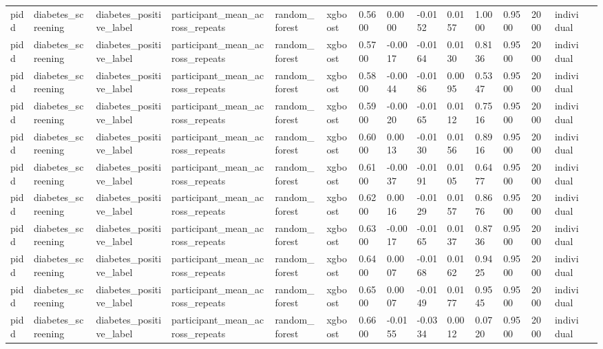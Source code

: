 \begin{tabular}{lllllllllllllll}
pidd & diabetes\_screening & diabetes\_positive\_label & participant\_mean\_across\_repeats & random\_forest & xgboost & 0.5600 & 0.0000 & -0.0152 & 0.0157 & 1.0000 & 0.9500 & 2000 & individual &  \\
pidd & diabetes\_screening & diabetes\_positive\_label & participant\_mean\_across\_repeats & random\_forest & xgboost & 0.5700 & -0.0017 & -0.0164 & 0.0130 & 0.8136 & 0.9500 & 2000 & individual &  \\
pidd & diabetes\_screening & diabetes\_positive\_label & participant\_mean\_across\_repeats & random\_forest & xgboost & 0.5800 & -0.0044 & -0.0186 & 0.0095 & 0.5347 & 0.9500 & 2000 & individual &  \\
pidd & diabetes\_screening & diabetes\_positive\_label & participant\_mean\_across\_repeats & random\_forest & xgboost & 0.5900 & -0.0020 & -0.0165 & 0.0112 & 0.7516 & 0.9500 & 2000 & individual &  \\
pidd & diabetes\_screening & diabetes\_positive\_label & participant\_mean\_across\_repeats & random\_forest & xgboost & 0.6000 & 0.0013 & -0.0130 & 0.0156 & 0.8916 & 0.9500 & 2000 & individual &  \\
pidd & diabetes\_screening & diabetes\_positive\_label & participant\_mean\_across\_repeats & random\_forest & xgboost & 0.6100 & -0.0037 & -0.0191 & 0.0105 & 0.6477 & 0.9500 & 2000 & individual &  \\
pidd & diabetes\_screening & diabetes\_positive\_label & participant\_mean\_across\_repeats & random\_forest & xgboost & 0.6200 & 0.0016 & -0.0129 & 0.0157 & 0.8676 & 0.9500 & 2000 & individual &  \\
pidd & diabetes\_screening & diabetes\_positive\_label & participant\_mean\_across\_repeats & random\_forest & xgboost & 0.6300 & -0.0017 & -0.0165 & 0.0137 & 0.8736 & 0.9500 & 2000 & individual &  \\
pidd & diabetes\_screening & diabetes\_positive\_label & participant\_mean\_across\_repeats & random\_forest & xgboost & 0.6400 & 0.0007 & -0.0168 & 0.0162 & 0.9425 & 0.9500 & 2000 & individual &  \\
pidd & diabetes\_screening & diabetes\_positive\_label & participant\_mean\_across\_repeats & random\_forest & xgboost & 0.6500 & 0.0007 & -0.0149 & 0.0177 & 0.9545 & 0.9500 & 2000 & individual &  \\
pidd & diabetes\_screening & diabetes\_positive\_label & participant\_mean\_across\_repeats & random\_forest & xgboost & 0.6600 & -0.0155 & -0.0334 & 0.0012 & 0.0720 & 0.9500 & 2000 & individual &  \\

\end{tabular}
